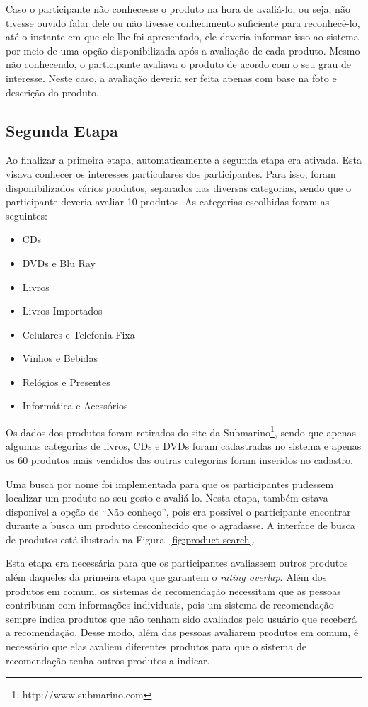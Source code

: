 Caso o participante não conhecesse o produto na hora de avaliá-lo, ou seja, não tivesse ouvido falar dele ou não tivesse conhecimento suficiente para reconhecê-lo, até o instante em que ele lhe foi apresentado, ele deveria informar isso ao sistema por meio de uma opção disponibilizada após a avaliação de cada produto. Mesmo não conhecendo, o participante avaliava o produto de acordo com o seu grau de interesse. Neste caso, a avaliação deveria ser feita apenas com base na foto e descrição do produto.

\subsection{Segunda Etapa}
\label{cha:segunda_etapa}

Ao finalizar a primeira etapa, automaticamente a segunda etapa era ativada. Esta visava conhecer os interesses particulares dos participantes. Para isso, foram disponibilizados vários produtos, separados nas diversas categorias, sendo que o participante deveria avaliar 10 produtos. As categorias escolhidas foram as seguintes:

\begin{itemize}
  \item CDs
  \item DVDs e Blu Ray
  \item Livros
  \item Livros Importados
  \item Celulares e Telefonia Fixa
  \item Vinhos e Bebidas
  \item Relógios e Presentes
  \item Informática e Acessórios
\end{itemize}

Os dados dos produtos foram retirados do site da Submarino\footnote{http://www.submarino.com}, sendo que apenas algumas categorias de livros, CDs e DVDs foram cadastradas no sistema e apenas os 60 produtos mais vendidos das outras categorias foram inseridos no cadastro.

Uma busca por nome foi implementada para que os participantes pudessem localizar um produto ao seu gosto e avaliá-lo. Nesta etapa, também estava disponível a opção de ``Não conheço'', pois era possível o participante encontrar durante a busca um produto desconhecido que o agradasse. A interface de busca de produtos está ilustrada na Figura~\ref{fig:product-search}.

Esta etapa era necessária para que os participantes avaliassem outros produtos além daqueles da primeira etapa que garantem o \textit{rating overlap}. Além dos produtos em comum, os sistemas de recomendação necessitam que as pessoas contribuam com informações individuais, pois um sistema de recomendação sempre indica produtos que não tenham sido avaliados pelo usuário que receberá a recomendação. Desse modo, além das pessoas avaliarem produtos em comum, é necessário que elas avaliem diferentes produtos para que o sistema de recomendação tenha outros produtos a indicar.

